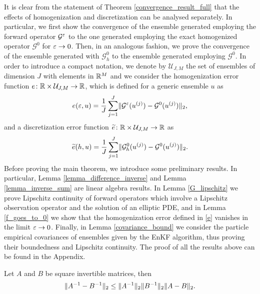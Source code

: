 It is clear from the statement of Theorem \ref{convergence_result_full} that the effects of homogenization and discretization can be analysed separately. In particular, we first show the convergence of the ensemble generated employing the forward operator $\mathcal G^\varepsilon$ to the one generated employing the exact homogenized operator $\mathcal G^0$ for $\varepsilon \to 0$. Then, in an analogous fashion, we prove the convergence of the ensemble generated with $\mathcal G^0_h$ to the ensemble generated employing $\mathcal G^0$. In order to introduce a compact notation, we denote by $\mathcal U_{J,M}$ the set of ensembles of dimension $J$ with elements in $\mathbb{R}^M$ and we consider the homogenization error function $e \colon \mathbb{R} \times \mathcal U_{J,M} \to \mathbb{R}$, which is defined for a generic ensemble $u$ as
\begin{equation} \label{e}
	e(\varepsilon, u) = \frac{1}{J} \sum_{j=1}^J \lVert\mathcal{G}^{\varepsilon}(u^{(j)}) - \mathcal{G}^0(u^{(j)})\rVert_2,
\end{equation}
and a discretization error function $\widetilde{e} \colon \mathbb{R} \times \mathcal U_{J,M} \to \mathbb{R}$ as
\begin{equation} \label{e_tilde}
	\widetilde e(h, u) = \frac{1}{J} \sum_{j=1}^J \lVert\mathcal{G}^0_h(u^{(j)}) - \mathcal{G}^0(u^{(j)})\rVert_2.
\end{equation}
Before proving the main theorem, we introduce some preliminary results. In particular, Lemma \ref{lemma_difference_inverse} and Lemma \ref{lemma_inverse_sum} are linear algebra results. In Lemma \ref{G_lipschitz} we prove Lipschitz continuity of forward operators which involve a Lipschitz observation operator and the solution of an elliptic PDE, and in Lemma \ref{f_goes_to_0} we show that the homogenization error defined in \eqref{e} vanishes in the limit $\varepsilon \to 0$. Finally, in Lemma \ref{covariance_bound} we consider the particle empirical covariances of ensembles given by the EnKF algorithm, thus proving their boundedness and Lipschitz continuity. The proof of all the results above can be found in the Appendix.

\begin{lemma} \label{lemma_difference_inverse}
Let $A$ and $B$ be square invertible matrices, then
\begin{equation*}
\lVert A^{-1} - B^{-1}\rVert_2 \le \lVert A^{-1}\rVert_2 \lVert B^{-1}\rVert_2 \lVert A - B\rVert_2.
\end{equation*}
\end{lemma}

